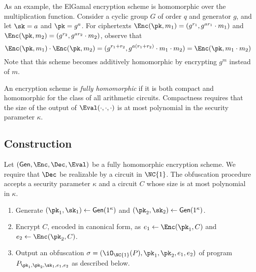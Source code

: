 As an example, the ElGamal encryption scheme is homomorphic over the multiplication function.
Consider a cyclic group $G$ of order $q$ and generator $g$, and let
$\sk = a$ and $\pk = g^a$.
For ciphertexts $\Enc(\pk, m_1) = (g^{r_1}, g^{a r_1} \cdot m_1)$
and $\Enc(\pk, m_2) = (g^{r_2}, g^{a r_2} \cdot m_2)$, observe that
\begin{equation*}
\Enc(\pk, m_1) \cdot \Enc(\pk, m_2) = (g^{r_1 + r_2}, g^{a (r_1 + r_2)}
\cdot m_1 \cdot m_2) = \Enc(\pk, m_1 \cdot m_2)
\end{equation*}
Note that this scheme becomes additively homomorphic by encrypting $g^m$
instead of $m$.

\begin{definition}
An encryption scheme is \emph{fully homomorphic} if it is both compact
and homomorphic for the class of all arithmetic circuits.
Compactness requires that the size of the output of $\Eval(\cdot, \cdot,
\cdot)$ is at most polynomial in the security parameter $\kappa$.
\end{definition}

\subsection{Construction}


\newcommand{\prog}[1]{\ensuremath{P_{\pk_1,\pk_2,\sk_{#1},e_1,e_2}}}

Let $(\GEN, \Enc, \Dec, \Eval)$ be a fully homomorphic encryption
scheme.
We require that $\Dec$ be realizable by a circuit in $\NC{1}$.
The obfuscation procedure accepts a security parameter $\kappa$ and
a circuit $C$ whose size is at most polynomial in $\kappa$.
\begin{enumerate}
\item
	Generate $(\pk_1, \sk_1) \gets \GEN(1^\kappa)$ and
	$(\pk_2, \sk_2) \gets \GEN(1^\kappa)$.
\item
	Encrypt $C$, encoded in canonical form, as
	$e_1 \gets \Enc(\pk_1, C)$ and $e_2 \gets \Enc(\pk_2, C)$.
\item
	Output an obfuscation
	$\sigma = (\iO_{\NC{1}}(P), \pk_1, \pk_2, e_1, e_2)$
	of program $\prog{1}$ as described below.
\end{enumerate}

